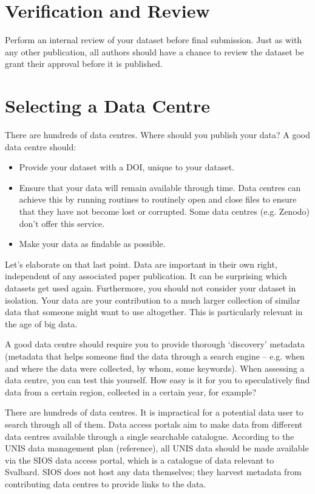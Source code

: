 \documentclass[a4paper,12pt]{article}
\begin{document}
\section{Verification and Review}
\label{sec:verification-review}

Perform an internal review of your dataset before final submission. Just as with any other publication, all authors should have a chance to review the dataset be grant their approval before it is published.

\section{Selecting a Data Centre}
There are hundreds of data centres. Where should you publish your data? A good data centre should:
\begin{itemize}
    \item Provide your dataset with a DOI, unique to your dataset.
    \item Ensure that your data will remain available through time. Data centres can achieve this by running routines to routinely open and close files to ensure that they have not become lost or corrupted. Some data centres (e.g. Zenodo) don’t offer this service.
    \item Make your data as findable as possible.
\end{itemize}

Let’s elaborate on that last point. Data are important in their own right, independent of any associated paper publication. It can be surprising which datasets get used again. Furthermore, you should not consider your dataset in isolation. Your data are your contribution to a much larger collection of similar data that someone might want to use altogether. This is particularly relevant in the age of big data.

A good data centre should require you to provide thorough ‘discovery’ metadata (metadata that helps someone find the data through a search engine – e.g. when and where the data were collected, by whom, some keywords). When assessing a data centre, you can test this yourself. How easy is it for you to speculatively find data from a certain region, collected in a certain year, for example?

There are hundreds of data centres. It is impractical for a potential data user to search through all of them. Data access portals aim to make data from different data centres available through a single searchable catalogue. According to the UNIS data management plan (reference), all UNIS data should be made available via the SIOS data access portal, which is a catalogue of data relevant to Svalbard. SIOS does not host any data themselves; they harvest metadata from contributing data centres to provide links to the data.
\end{document}
